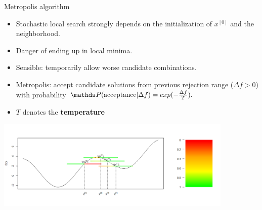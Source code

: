 \documentclass[11pt,compress,t,notes=noshow, xcolor=table]{beamer}
\begin{document}
\begin{vbframe}{Metropolis algorithm}
\begin{itemize}
\item Stochastic local search strongly depends on the initialization of $x^{[0]}$ and the neighborhood.
\item Danger of ending up in local minima.
\item Sensible: temporarily allow worse candidate combinations.
\item Metropolis: accept candidate solutions from previous rejection range ($\Delta f > 0$) with probability $\P(\text{acceptance} | \Delta f) = exp(-\frac{\Delta f}{T}).$
\item $T$ denotes the \textbf{temperature}
\end{itemize}

\vspace{-0.5cm}
\begin{center}
\includegraphics[width=0.85\textwidth]{figure_man/metropolis-algorithm.png}
\end{center}
\vspace{-0.6cm}









\end{vbframe}
\end{document}
